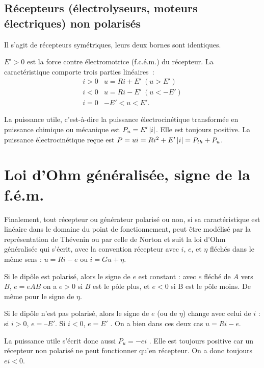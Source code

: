 \subsection{Récepteurs (électrolyseurs, moteurs électriques) non polarisés}
Il s'agit de récepteurs symétriques, leurs deux bornes sont identiques. 

$E' > 0$ est la force contre électromotrice (f.c.é.m.) du récepteur. La caractéristique comporte trois parties linéaires~:
\begin{align}
i > 0 & u = R i + E' \ (u > E') \\
i < 0 & u  = R i - E' \ (u < -E') \\
i = 0 &  - E' < u < E'.
\end{align}

La puissance utile, c'est-à-dire la puissance électrocinétique transformée en puissance chimique ou mécanique est $P_u = E' \left\lvert i\right\rvert$. Elle est toujours positive. La puissance électrocinétique reçue est $P = u i = R i^2 + E' \left\lvert i\right\rvert = P_{th} + P_u$.

\section{Loi d'Ohm généralisée, signe de la f.é.m.}
Finalement, tout récepteur ou générateur polarisé ou non, si sa caractéristique est linéaire dans le domaine du point de fonctionnement, peut être modélisé par la représentation de Thévenin ou par celle de Norton et suit la loi d'Ohm généralisée qui s'écrit, avec la convention récepteur avec $i$, $e$, et $\eta$ fléchés dans le même sens : $u = R i - e$ ou $i = G u + \eta$.

Si le dipôle est polarisé, alors le signe de $e$ est constant : avec $e$ fléché de $A$ vers $B$, $e = eAB$ on a $e > 0$ si $B$ est le pôle plus, et $e < 0$ si B est le pôle moins. De même pour le signe de $\eta$.

Si le dipôle n'est pas polarisé, alors le signe de $e$ (ou de $\eta$) change avec celui de $i$ : si $i > 0$, $e = –E'$. Si $i < 0$, $e = E'$ . On a bien dans ces deux cas $u = R i - e$.

La puissance utile s'écrit donc aussi $P_u = - e i$ . Elle est toujours positive car un récepteur non polarisé ne peut fonctionner qu'en récepteur. On a donc toujours $ei < 0$.